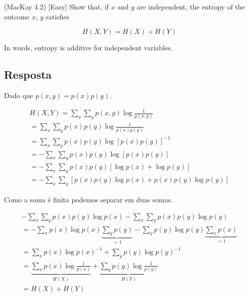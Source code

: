 (MacKay 4.2) [Easy] Show that, if $x$ and $y$ are independent, the entropy of the outcome $x$, $y$ satisfies

\[H(X,Y) = H(X) + H(Y)\]

In words, entropy is additive for independent variables.

\subsection*{Resposta}

Dado que $p(x,y) = p(x)p(y)$.

\[\begin{array}{l}
H(X,Y) = \sum\limits_x {\sum\limits_y {p(x,y)\log \frac{1}{{p(x,y)}}} } \\
 = \sum\limits_x {\sum\limits_y {p(x)p(y)\log \frac{1}{{p(x)p(y)}}} } \\
 = \sum\limits_x {\sum\limits_y {p(x)p(y)\log {{\left[ {p(x)p(y)} \right]}^{ - 1}}} } \\
 =  - \sum\limits_x {\sum\limits_y {p(x)p(y)\log \left[ {p(x)p(y)} \right]} } \\
 =  - \sum\limits_x {\sum\limits_y {p(x)p(y)\left[ {\log p(x) + \log p(y)} \right]} } \\
 =  - \sum\limits_x {\sum\limits_y {\left[ {p(x)p(y)\log p(x) + p(x)p(y)\log p(y)} \right]} } 
\end{array}\]

Como a soma é finita podemos separar em duas somas.

\[\begin{array}{l}
 - \sum\limits_x {\sum\limits_y {p(x)p(y)\log p(x)} }  - \sum\limits_x {\sum\limits_y {p(x)p(y)\log p(y)} } \\
 =  - \sum\limits_x {p(x)\log p(x)\underbrace {\sum\limits_y {p(y)} }_{ = 1}}  - \sum\limits_y {p(y)\log p(y)\underbrace {\sum\limits_x {p(x)} }_{ = 1}} \\
 = \sum\limits_x {p(x)\log p{{(x)}^{ - 1}}} + \sum\limits_y {p(y)\log p{{(y)}^{ - 1}}} \\
 = \underbrace {\sum\limits_x {p(x)\log \frac{1}{{p(x)}}} }_{H(X)} + \underbrace {\sum\limits_y {p(y)\log \frac{1}{{p(y)}}} }_{H(Y)} \\
 = H(X) + H(Y)
\end{array}\]